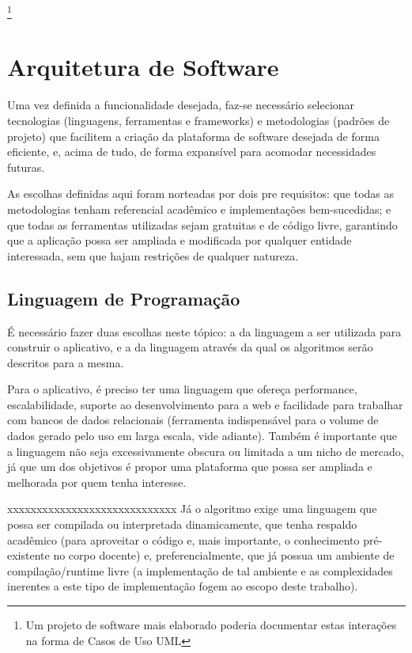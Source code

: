 \documentclass{abnt}
\begin{document}
	\footnote{Um projeto de software mais elaborado poderia documentar estas interações na forma de Casos de Uso UML\cite{}}

\chapter {Arquitetura de Software}



Uma vez definida a funcionalidade desejada, faz-se necessário selecionar tecnologias (linguagens, ferramentas e frameworks) e metodologias (padrões de projeto) que facilitem a criação da plataforma de software desejada de forma eficiente, e, acima de tudo, de forma expansível para acomodar necessidades futuras.

	As escolhas definidas aqui foram norteadas por dois pre requisitos: que todas as metodologias tenham referencial acadêmico e implementações bem-sucedidas; e que todas as ferramentas utilizadas sejam gratuitas e de código livre, garantindo que a aplicação  possa ser ampliada e modificada por qualquer entidade interessada, sem que hajam restrições de qualquer natureza.
\section{Linguagem de Programação}
É necessário fazer duas escolhas neste tópico: a da linguagem a ser utilizada para construir o aplicativo, e a da linguagem através da qual os algoritmos serão descritos para a mesma.

Para o aplicativo, é preciso ter uma linguagem que ofereça performance, escalabilidade, suporte ao desenvolvimento para a web e facilidade para trabalhar com bancos de dados relacionais (ferramenta indispensável para o volume de dados gerado pelo uso em larga escala, vide adiante). Também é importante que a linguagem não seja excessivamente obscura ou limitada a um nicho de mercado, já que um dos objetivos é propor uma plataforma que possa ser ampliada e melhorada por quem tenha interesse.

xxxxxxxxxxxxxxxxxxxxxxxxxxxxx
	Já o algoritmo exige uma linguagem que possa ser compilada ou interpretada dinamicamente, que tenha respaldo acadêmico (para aproveitar o código e, mais importante, o conhecimento pré-existente no corpo docente) e, preferencialmente, que já possua um ambiente de compilação/runtime livre (a implementação de tal ambiente e as complexidades inerentes a este tipo de implementação fogem ao escopo deste trabalho). 
\end{document}
